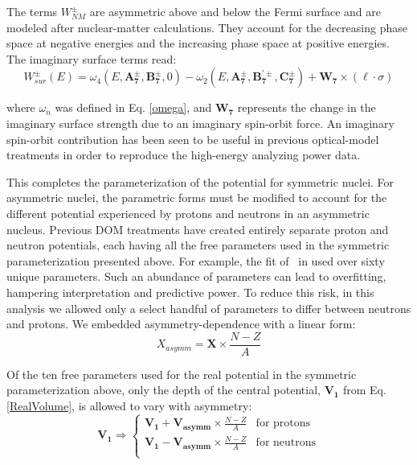 \noindent
The terms $W_{NM}^{\pm}$ are asymmetric above and below the Fermi surface and are modeled after
nuclear-matter calculations. They account for the decreasing phase space at negative energies
and the increasing phase space at positive energies. The imaginary surface terms read:
\begin{equation} \label{ImagSurface}
    W_{sur}^{\pm}(E) = \omega_{4}(E, \bm{A_{7}^{\pm}}, \bm{B_{7}^{\pm}}, 0)
    - \omega_{2}(E, \bm{A_{7}^{\pm}}, \bm{B_{7}^{'\pm}}, \bm{C_{7}^{\pm}}) + 
    \bm{W_{7}}\times(\ell\cdot\sigma)
\end{equation}

\noindent
where $\omega_{n}$ was defined in Eq. \ref{omega}, and $\bm{W_{7}}$ represents the change in the
imaginary surface strength due to an imaginary spin-orbit force. An imaginary spin-orbit
contribution has been seen to be useful in previous optical-model treatments in order to reproduce 
the high-energy analyzing power data.

This completes the parameterization of the potential for symmetric nuclei. For asymmetric nuclei,
the parametric forms must be modified to account for the different potential experienced by protons 
and neutrons in an asymmetric nucleus. Previous DOM treatments have created entirely separate
proton and neutron potentials, each having all the free parameters used in the symmetric
parameterization presented above. For example, the fit of \caEight\ in
\cite{MahzoonPhDThesis} used over sixty unique parameters. Such an abundance of
parameters can lead to overfitting, hampering interpretation and predictive power.
To reduce this risk, in this analysis we allowed only a select handful of parameters
to differ between neutrons and protons. We embedded asymmetry-dependence with a linear form:
\begin{equation}
    X_{asymm} = \bm{X}\times\frac{N-Z}{A}
\end{equation}

Of the ten free parameters used for the real potential in the symmetric parameterization above,
only the depth of the central potential,
$\bm{V_{1}}$ from Eq. \ref{RealVolume}, is allowed to vary with asymmetry:
\begin{equation}
    \bm{V_{1}} \Rightarrow \begin{cases}
        \bm{V_{1}} + \bm{V_{asymm}}\times\frac{N-Z}{A} & \text{for protons}\\
        \bm{V_{1}} - \bm{V_{asymm}}\times\frac{N-Z}{A} & \text{for neutrons}\\
    \end{cases}
\end{equation}

